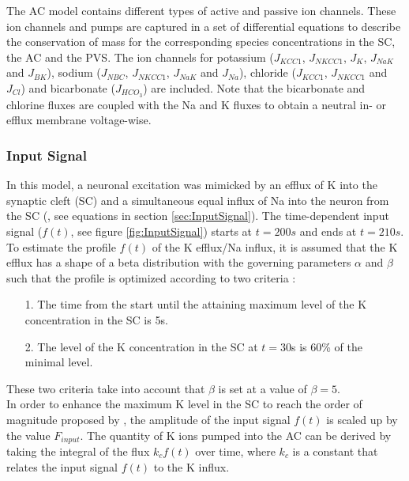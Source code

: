 The AC model contains different types of active and passive ion channels. These ion channels and pumps are captured in a set of differential equations to describe the conservation of mass for the corresponding species concentrations in the SC, the \gls{AC} and the \gls{PVS}. The ion channels for potassium ($ J_{KCC1}$, $ J_{NKCC1} $, $ J_{K}$, $ J_{NaK} $ and $J_{BK}$), sodium ($ J_{NBC} $, $ J_{NKCC1} $,  $ J_{NaK} $ and  $ J_{Na} $), chloride ($ J_{KCC1}$, $ J_{NKCC1} $ and $ J_{Cl} $) and bicarbonate ($ J_{HCO_3}$) are included. Note that the bicarbonate and chlorine fluxes are coupled with the \gls{Na} and \gls{K} fluxes to obtain a neutral in- or efflux membrane voltage-wise.\\

\subsubsection{Input Signal}
In this model, a neuronal excitation was mimicked by an efflux of \gls{K} into the synaptic cleft (SC) and a simultaneous equal influx of \gls{Na} into the neuron from the SC (\citet{Ostby2009}, see equations in section \ref{sec:InputSignal}). The time-dependent input signal ($f(t)$, see figure \ref{fig:InputSignal}) starts at $t=200 s$ and ends at $t=210 s$. To estimate the profile $f(t)$ of the \gls{K} efflux/\gls{Na} influx, it is assumed that the \gls{K} efflux has a shape of a beta distribution with the governing parameters $\alpha$ and $\beta$ such that the profile is optimized according to two criteria \cite{Ostby2009}:\\
%
\begin{itemize}
\item [1.] The time from the start until the attaining maximum level of the \gls{K} concentration in the SC is 5s.
\item [2.] The level of the \gls{K} concentration in the SC at $ t = 30 $s is 60\% of the minimal level.
\end{itemize}
%
These two criteria take into account that $\beta$ is set at a value of $\beta = 5$.\\

In order to enhance the maximum \gls{K} level in the SC to reach the order of magnitude proposed by \citet{Filosa2004}, the amplitude of the input signal $f(t)$ is scaled up by the value $F_{input}$. The quantity of \gls{K} ions pumped into the AC can be derived by taking the integral of the flux $k_c f(t)$ over time, where $k_c$ is a constant that relates the input signal $f(t)$ to the \gls{K} influx. \\

